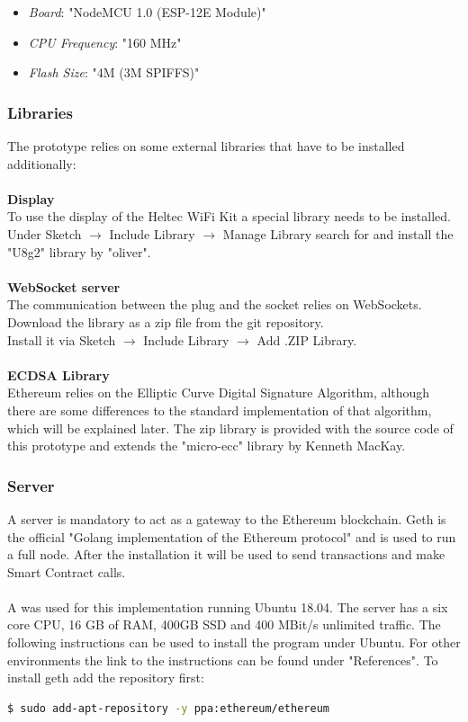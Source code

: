 \begin{itemize}
    \item \textit{Board}: "NodeMCU 1.0 (ESP-12E Module)"
    \item \textit{CPU Frequency}: "160 MHz"
    \item \textit{Flash Size}: "4M (3M SPIFFS)"
\end{itemize}
\leavevmode

\subsubsection{Libraries}
The prototype relies on some external libraries that have to be installed additionally:
\\\\
\textbf{Display}\\
To use the display of the Heltec WiFi Kit a special library needs to be installed. Under Sketch $\rightarrow$ Include Library $\rightarrow$ Manage Library search for and install the "U8g2" library by "oliver".
\\\\
\textbf{WebSocket server}\\
The communication between the plug and the socket relies on WebSockets. Download the library as a zip file from the git repository\cite{websockets}.
\\
Install it via Sketch $\rightarrow$ Include Library $\rightarrow$ Add .ZIP Library.
\\\\
\textbf{ECDSA Library}\\
Ethereum relies on the Elliptic Curve Digital Signature Algorithm, although there are some differences to the standard implementation of that algorithm, which will be explained later. The zip library is provided with the source code of this prototype and extends the "micro-ecc" library by Kenneth MacKay\cite{micro-ecc}.
\\

\subsubsection{Server}
A server is mandatory to act as a gateway to the Ethereum blockchain. Geth is the official "Golang implementation of the Ethereum protocol"\cite{geth} and is used to run a full node. After the installation it will be used to send transactions and make Smart Contract calls.
\\\\
A  was used for this implementation running Ubuntu 18.04. The server has a six core CPU, 16 GB of RAM, 400GB SSD and 400 MBit/s unlimited traffic. The following instructions can be used to install the program under Ubuntu. For other environments the link to the instructions can be found under "References"\cite{geth-instructions}.
\newpage
To install geth add the repository first:
\begin{lstlisting}[language=bash, numbers=none]
  $ sudo add-apt-repository -y ppa:ethereum/ethereum
\end{lstlisting}

